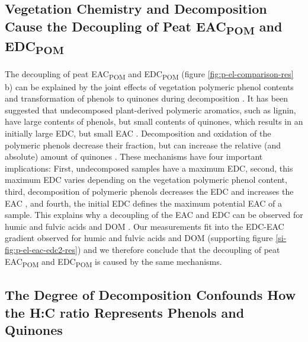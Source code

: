 \documentclass[draft,linenumbers]{agujournal2018}
\begin{document}
\subsection{\texorpdfstring{Vegetation Chemistry and Decomposition Cause
the Decoupling of Peat EAC\textsubscript{POM} and
EDC\textsubscript{POM}}{Vegetation Chemistry and Decomposition Cause the Decoupling of Peat EAC and EDC}}

The decoupling of peat EAC\textsubscript{POM} and EDC\textsubscript{POM}
(figure \ref{fig:p-el-comparison-res} b) can be explained by the joint
effects of vegetation polymeric phenol contents and transformation of
phenols to quinones during decomposition \citep{Aeschbacher.2012}. It
has been suggested that undecomposed plant-derived polymeric aromatics,
such as lignin, have large contents of phenols, but small contents of
quinones, which results in an initially large EDC, but small EAC
\citep{Aeschbacher.2012}. Decomposition and oxidation of the polymeric
phenols decrease their fraction, but can increase the relative (and
absolute) amount of quinones
\citep{Aeschbacher.2012, Bolton.2018, LaCroix.2020}. These mechanisms
have four important implications: First, undecomposed samples have a
maximum EDC, second, this maximum EDC varies depending on the vegetation
polymeric phenol content, third, decomposition of polymeric phenols
decreases the EDC and increases the EAC \citep{Aeschbacher.2012}, and
fourth, the initial EDC defines the maximum potential EAC of a sample.
This explains why a decoupling of the EAC and EDC can be observed for
humic and fulvic acids and DOM \citep{Aeschbacher.2012}. Our
measurements fit into the EDC-EAC gradient observed for humic and fulvic
acids and DOM (supporting figure \ref{si-fig:p-el-eac-edc2-res}) and we
therefore conclude that the decoupling of peat EAC\textsubscript{POM}
and EDC\textsubscript{POM} is caused by the same mechanisms.

\subsection{The Degree of Decomposition Confounds How the H:C ratio
Represents Phenols and Quinones}
\end{document}
